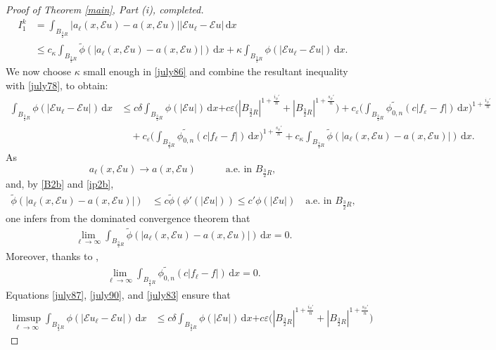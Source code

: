 \documentclass[leqno,11pt]{amsart}%
\numberwithin{equation}{section}
\newcommand{\eps}{\varepsilon}
\def\d{\mathrm{d}}
\def\E{\mathcal{E}}
\def\dx{\d x}
\theoremstyle{definition}
\numberwithin{equation}{section}
\begin{document}
\begin{proof}[Proof of Theorem \ref{main}, Part (i), completed]
{\begin{align}
    \label{july86}
   I_1^k & = \int_{B_{\frac{3}{2}R}}|a_\ell(x,\E u)- a(x,\E u)|| \E u_\ell-\E u|\, \d x 
   \\ \nonumber & \leq c_\kappa \int_{B_{\frac{3}{2}R}}\widetilde \phi (|a_\ell(x,\E u)- a(x,\E u)|)\, \dx + \kappa\int_{B_{\frac{3}{2}R}}\phi(| \E u_\ell-\E u|)\, \d x.
\end{align}
We now choose $\kappa$ small enough in
\eqref{july86} and combine the resultant inequality with \eqref{july78}, to obtain:
\begin{align}
    \label{july87}
     \int_{B_{\frac{3}{2}R}}\phi (|\E u_\ell-\E u|)\, \d x &  \leq 
    c \delta \int_{B_{\frac{3}{2}R}}\phi (|\E u|)\, \d x 
   {
     +c\eps\big(|B_{\frac{3}{2}R}|^{1+\frac{{i_\phi'}}{n}}+|B_{\frac{3}{2}R}|^{1+\frac{{s_\phi'}}{n}}\big)
     }
     + 
      c_\eps\bigg( \int_{B_{\frac{3}{2}R}}\widetilde{\phi_{0,n}}(c|f_\varepsilon-f|)\,\dx\bigg)^{1+\frac{ {i_\phi'}}{n}}
       \\ \nonumber & \quad
     +
     c_\eps\bigg( \int_{B_{\frac{3}{2}R}} \widetilde{\phi_{0,n}}(c|f_\ell-f|)\,\dx\bigg)^{1+\frac{{s_\phi'}}{n}} +
c_\kappa\int_{B_{\frac{3}{2}R}}\widetilde \phi (|a_\ell(x,\E u)- a(x,\E u)|)\, \dx.
\end{align}
As
$$a_\ell(x,\E u)\to a(x,\E u)\qquad\quad \text{a.e. in}\,\,  B_{\frac{3}{2}R},$$
and, by \eqref{B2b} and \eqref{ip2b},
\begin{align}
    \label{july79}
    \widetilde \phi(|a_\ell(x,\E u)- a(x,\E u)|)& \leq c  \widetilde\phi(\phi'(|\E u|))   \leq c'
      \phi(|\E u|) \quad \text{a.e. in $B_{\frac{3}{2}R}$,}
\end{align}
one infers from the dominated convergence theorem that
\begin{align}
    \label{july90}
\lim_{\ell\to \infty}\int_{B_{\frac{3}{2}R}}\widetilde \phi (|a_\ell(x,\E u)- a(x,\E u)|)\, \dx =0.
\end{align}
Moreover, thanks to \cite[Lemma 5]{Gossez-studia},
\begin{align}
    \label{july83}
   \lim _{\ell\to \infty}
    \int_{B_{\frac{3}{2}R}}\widetilde{\phi_{0,n}}(c|f_\ell-f|)\,\dx =0.
\end{align}
Equations \eqref{july87}, \eqref{july90}, and \eqref{july83} ensure that
\begin{align}
    \label{july80}
    \limsup_{\ell\to \infty}\int_{B_{\frac{3}{2}R}}\phi (|\E u_\ell-\E u|)\, \d x & \leq 
     c\delta \int_{B_{\frac{3}{2}R}}\phi (|\E u|)\, \d x
   {
     +c\eps\big(|B_{\frac{3}{2}R}|^{1+\frac{ {i_\phi'}}{n}}+|B_{\frac{3}{2}R}|^{1+\frac{ {s_\phi'}}{n}}\big)
}
\end{align}}
\end{proof}
\end{document}
